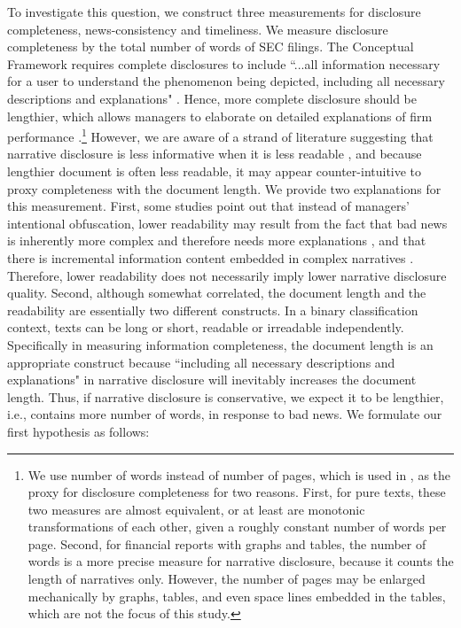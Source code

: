 \documentclass[a4paper]{article}
\begin{document}
\begin{spacing}{2}
To investigate this question, we construct three measurements for disclosure completeness, news-consistency and timeliness. We measure disclosure completeness by the total number of words of SEC filings. The Conceptual Framework requires complete disclosures to include ``...all information necessary for a user to understand the phenomenon being depicted, including all necessary descriptions and explanations" . Hence, more complete disclosure should be lengthier, which allows managers to elaborate on detailed explanations of firm performance \cite{leuzDisclosureCostCapital2009}.\footnote{We use number of words instead of number of pages, which is used in , as the proxy for disclosure completeness for two reasons. First, for pure texts, these two measures are almost equivalent, or at least are monotonic transformations of each other, given a roughly constant number of words per page. Second, for financial reports with graphs and tables, the number of words is a more precise measure for narrative disclosure, because it counts the length of narratives only. However, the number of pages may be enlarged mechanically by graphs, tables, and even space lines embedded in the tables, which are not the focus of this study.} However, we are aware of a strand of literature suggesting that narrative disclosure is less informative when it is less readable , and because lengthier document is often less readable, it may appear counter-intuitive to proxy completeness with the document length. We provide two explanations for this measurement. First, some studies point out that instead of managers' intentional obfuscation, lower readability may result from the fact that bad news is inherently more complex and therefore needs more explanations , and that there is incremental information content embedded in complex narratives . Therefore, lower readability does not necessarily imply lower narrative disclosure quality. Second, although somewhat correlated, the document length and the readability are essentially two different constructs. In a binary classification context, texts can be long or short, readable or irreadable independently. Specifically in measuring information completeness, the document length is an appropriate construct because ``including all necessary descriptions and explanations"  in narrative disclosure will inevitably increases the document length. Thus, if narrative disclosure is conservative, we expect it to be lengthier, i.e., contains more number of words, in response to bad news. We formulate our first hypothesis as follows:


\end{spacing}
\end{document}
